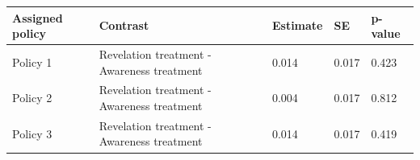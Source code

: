 \begin{tabular}{lllll}
\toprule
Assigned policy & Contrast & Estimate & SE & p-value\\
\midrule
Policy 1 & Revelation treatment - Awareness treatment & 0.014 & 0.017 & 0.423\\
Policy 2 & Revelation treatment - Awareness treatment & 0.004 & 0.017 & 0.812\\
Policy 3 & Revelation treatment - Awareness treatment & 0.014 & 0.017 & 0.419\\
\bottomrule
\end{tabular}
